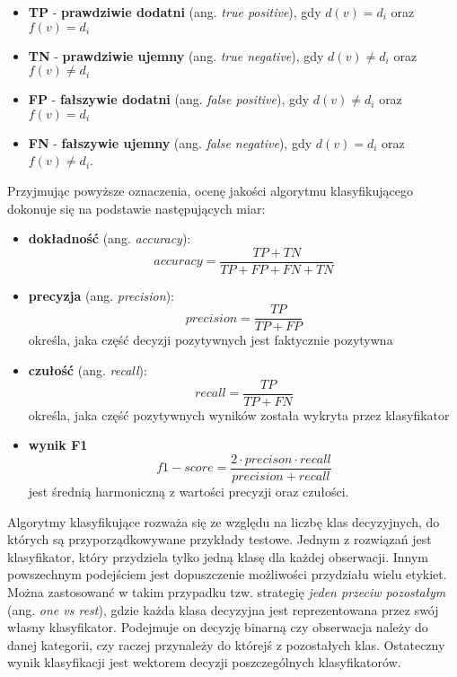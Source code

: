 \documentclass{pracamgr}
\begin{document}
\begin{itemize}
    \item \textbf{TP} - \textbf{prawdziwie dodatni} (ang. \textit{true positive}), gdy $d(v) = d_i$ oraz $f(v) = d_i$
    \item \textbf{TN} - \textbf{prawdziwie ujemny} (ang. \textit{true negative}), gdy $d(v) \neq d_i$ oraz $f(v) \neq d_i$
    \item \textbf{FP} - \textbf{fałszywie dodatni} (ang. \textit{false positive}), gdy $d(v) \neq d_i$ oraz $f(v) = d_i$
    \item \textbf{FN} - \textbf{fałszywie ujemny} (ang. \textit{false negative}), gdy $d(v) = d_i$ oraz $f(v) \neq d_i$.
\end{itemize}

Przyjmując powyższe oznaczenia, ocenę jakości algorytmu klasyfikującego dokonuje się na podstawie następujących miar:

\begin{itemize}
    \item \textbf{dokładność} (ang. \textit{accuracy}):
        \[
            accuracy = \frac{TP + TN}{TP + FP + FN + TN}
        \]
    \item \textbf{precyzja} (ang. \textit{precision}):
        \[
            precision = \frac{TP}{TP + FP}
        \]
        określa, jaka część decyzji pozytywnych jest faktycznie pozytywna 
    \item \textbf{czułość} (ang. \textit{recall}):
        \[
            recall = \frac{TP}{TP + FN}
        \]
        określa, jaka część pozytywnych wyników została wykryta przez klasyfikator
    \item \textbf{wynik F1}
        \[
            f1-score = \frac{2 \cdot precison \cdot recall}{precision + recall} 
        \]
        jest średnią harmoniczną z wartości precyzji oraz czułości.
\end{itemize}

Algorytmy klasyfikujące rozważa się ze względu na liczbę klas decyzyjnych, do których są przyporządkowywane przykłady testowe. Jednym z rozwiązań jest klasyfikator, który przydziela tylko jedną klasę dla każdej obserwacji. Innym powszechnym podejściem jest dopuszczenie możliwości przydziału wielu etykiet. Można zastosowanć w takim przypadku tzw. strategię \textit{jeden przeciw pozostałym} (ang. \textit{one vs rest}), gdzie każda klasa decyzyjna jest reprezentowana przez swój własny klasyfikator. Podejmuje on decyzję binarną czy obserwacja należy do danej kategorii, czy raczej przynależy do którejś z pozostałych klas. Ostateczny wynik klasyfikacji jest wektorem decyzji poszczególnych klasyfikatorów.
\end{document}
